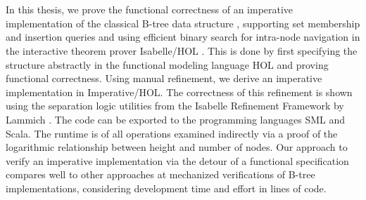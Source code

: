 \chapter{\abstractname}

In this thesis, we prove the functional correctness
of an imperative implementation of the classical B-tree data structure \parencite{DBLP:journals/acta/BayerM72},
supporting set membership and insertion queries
and using efficient binary search for intra-node navigation
in the interactive theorem prover Isabelle/HOL \parencite{DBLP:books/sp/NipkowPW02}.
This is done by first specifying the structure abstractly 
in the functional modeling language HOL and proving functional correctness.
Using manual refinement, we derive an imperative implementation
in Imperative/HOL. The correctness of this refinement is shown using
the separation logic utilities from the
Isabelle Refinement Framework by Lammich \parencite{DBLP:journals/jar/Lammich19}. 
The code can be exported to the programming languages SML and Scala.
The runtime is of all operations examined indirectly via a
proof of the logarithmic relationship between height and number of nodes.
Our approach to verify an imperative implementation
via the detour of a functional specification
compares well to other approaches at mechanized
verifications of B-tree implementations,
considering development time and effort in lines of code.




